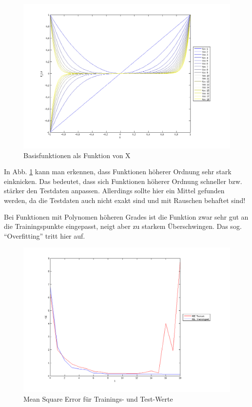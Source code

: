 \begin{figure}[hp!]
\begin{center}
 \includegraphics[width=1\textwidth]{./figures/1_1_1_base_fct}
 \caption[Basisfunktionen als Funktion von X]{Basisfunktionen als Funktion von X}
\label{fig:base_fct}
\end{center}
\end{figure}
In Abb. \ref{fig:base_fct} kann man erkennen, dass Funktionen höherer Ordnung sehr stark einknicken. Das bedeutet, dass sich Funktionen höherer Ordnung 
schneller bzw. stärker den Testdaten anpassen. Allerdings sollte hier ein Mittel gefunden werden, da die Testdaten auch nicht exakt sind und mit
Rauschen behaftet sind! 

Bei Funktionen mit Polynomen höheren Grades ist die Funktion zwar sehr gut an die Trainingspunkte eingepasst, neigt aber zu starkem Überschwingen.
Das sog. ``Overfitting'' tritt hier auf.


\begin{figure}[hp!]
\begin{center}
 \includegraphics[width=1\textwidth]{./figures/1_1_1_MSE}
 \caption[Mean Square Error]{Mean Square Error für Trainings- und Test-Werte}
\label{fig:MSE}
\end{center}
\end{figure}

